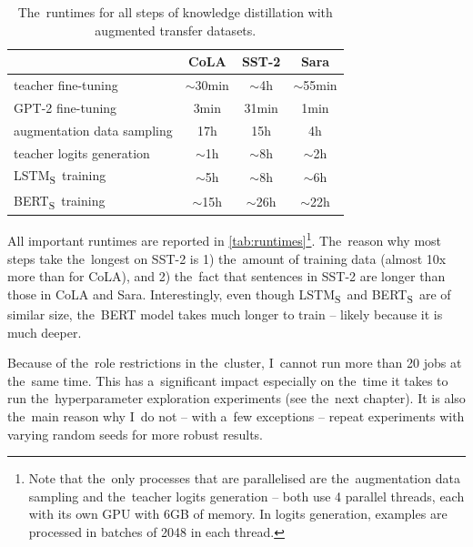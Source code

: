 \documentclass[bsc,frontabs,singlespacing,parskip,deptreport]{infthesis}
\def\BERTS{BERT\textsubscript{S}}
\def\LSTMS{LSTM\textsubscript{S}}
\begin{document}
{{    \begin{table}[h!t]
    \centering
    \footnotesize
    \begin{tabular}{m{}ccc}
    \toprule
    & CoLA & SST-2 & Sara \\
    \toprule
    teacher fine-tuning & $\sim$30min & $\sim$4h & $\sim$55min \\
    \hline
    GPT-2 fine-tuning & 3min & 31min & 1min \\
    \hline
    augmentation data sampling & 17h & 15h & 4h \\
    \hline
    teacher logits generation & $\sim$1h & $\sim$8h & $\sim$2h \\
    \hline
    \LSTMS~training & $\sim$5h & $\sim$8h & $\sim$6h \\
    \hline
    \BERTS~training & $\sim$15h & $\sim$26h & $\sim$22h \\
    \bottomrule
    \end{tabular}
    \caption{The~runtimes for all steps of knowledge distillation with augmented transfer datasets.}
    \label{tab:runtimes}
    \end{table}

    All important runtimes are reported in \autoref{tab:runtimes}\footnote{Note that the~only processes that are parallelised are the~augmentation data sampling and the~teacher logits generation -- both use 4 parallel threads, each with its own GPU with 6GB of memory. In logits generation, examples are processed in batches of 2048 in each thread.}.
    The~reason why most steps take the~longest on SST-2 is 1) the~amount of training data (almost 10x more than for CoLA), and 2) the~fact that sentences in SST-2 are longer than those in CoLA and Sara.
    Interestingly, even though \LSTMS~and \BERTS~are of similar size, the~BERT model takes much longer to train -- likely because it is much deeper.

    Because of the~role restrictions in the~cluster, I~cannot run more than 20 jobs at the~same time. This has a~significant impact especially on the~time it takes to run the~hyperparameter exploration experiments (see the~next chapter). 
    It is also the~main reason why I~do not -- with a~few exceptions -- repeat experiments with varying random seeds for more robust results. 

  }

}
\end{document}
